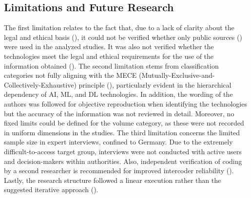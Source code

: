 \documentclass[10pt]{article}
\begin{document}
\subsection{Limitations and Future Research}

The first limitation relates to the fact that, due to a lack of clarity about the legal
and ethical basis (\cite{Ghioni.2023,Wittmer.2022}),
it could not be verified whether only public sources (\cite{NorthAtlanticTreatyOrganization.2002}) were used
in the analyzed studies. It was also not verified whether the technologies meet the
legal and ethical requirements for the use of the information obtained
(\cite{PastorGalindo.2020,Wittmer.2022}). The second
limitation stems from classification categories not fully aligning with the
MECE (Mutually-Exclusive-and-Collectively-Exhaustive) principle (\cite{Lee.2018}),
particularly evident in the hierarchical dependency of AI, ML, and DL technologies. In addition,
the wording of the authors was followed for objective reproduction when identifying the technologies
but the accuracy of the information was not reviewed in detail. Moreover, no fixed limits could be defined
for the volume category, as these were not recorded in uniform dimensions in the studies.
The third limitation concerns the limited sample size in expert interviews, confined to Germany. Due to the
extremely difficult-to-access target group, interviews were not conducted with active users and decision-makers within authorities.
Also, independent verification of coding by a second researcher is recommended for improved intercoder reliability
(\cite{Glaser.2009}). Lastly, the research structure followed a linear execution rather than the suggested iterative approach (\cite{Peffers.2007}).
\end{document}
